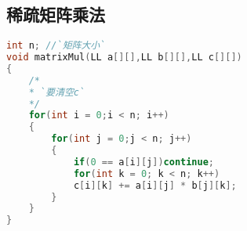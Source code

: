 ﻿\subsection{稀疏矩阵乘法}
    \begin{lstlisting}[language=C++]
int n; //`矩阵大小`
void matrixMul(LL a[][],LL b[][],LL c[][])
{
	/*
	* `要清空c`
	*/
    for(int i = 0;i < n; i++)
    {
        for(int j = 0;j < n; j++)
        {
            if(0 == a[i][j])continue;
            for(int k = 0; k < n; k++)
            c[i][k] += a[i][j] * b[j][k];
        }
    }
}
    \end{lstlisting}
